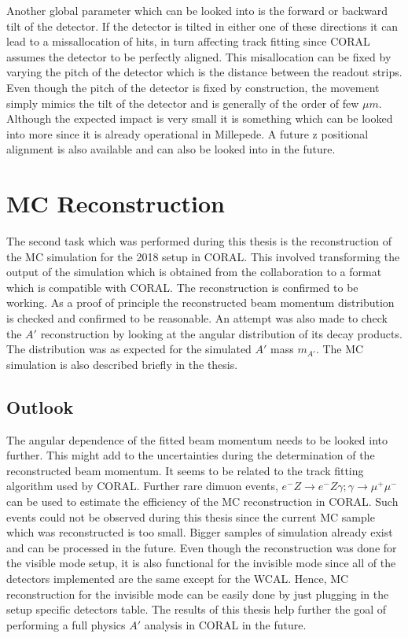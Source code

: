 Another global parameter which can be looked into is the forward or backward tilt of the detector. If the detector is tilted in either one of these directions it can lead to a missallocation of hits, in turn affecting track fitting since CORAL assumes the detector to be perfectly aligned. This misallocation can be fixed by varying the pitch of the detector which is the distance between the readout strips. Even though the pitch of the detector is fixed by construction, the movement simply mimics the tilt of the detector and is generally of the order of few $\mu m$. Although the expected impact is very small it is something which can be looked into more since it is already operational in Millepede. A future z positional alignment is also available and can also be looked into in the future.

\section*{MC Reconstruction}
The second task which was performed during this thesis is the reconstruction of the MC simulation for the 2018 setup in CORAL. This involved transforming the output of the simulation which is obtained from the collaboration to a format which is compatible with CORAL. The reconstruction is confirmed to be working. As a proof of principle the reconstructed beam momentum distribution is checked and confirmed to be reasonable. An attempt was also made to check the $A'$ reconstruction by looking at the angular distribution of its decay products. The distribution was as expected for the simulated $A'$ mass $m_{A'}$. The MC simulation is also described briefly in the thesis.

\subsection*{Outlook}
The angular dependence of the fitted beam momentum needs to be looked into further. This might add to the uncertainties during the determination of the reconstructed beam momentum. It seems to be related to the track fitting algorithm used by CORAL. Further rare dimuon events, $e^-Z\rightarrow e^-Z\gamma;\gamma\rightarrow \mu^{+} \mu^{-} $ can be used to estimate the efficiency of the MC reconstruction in CORAL. Such events could not be observed during this thesis since the current MC sample which was reconstructed is too small. Bigger samples of simulation already exist and can be processed in the future. Even though the reconstruction was done for the visible mode setup, it is also functional for the invisible mode since all of the detectors implemented are the same except for the WCAL. Hence, MC reconstruction for the invisible mode can be easily done by just plugging in the setup specific detectors table. The results of this thesis help further the goal of performing a full physics $A'$ analysis in CORAL in the future.


